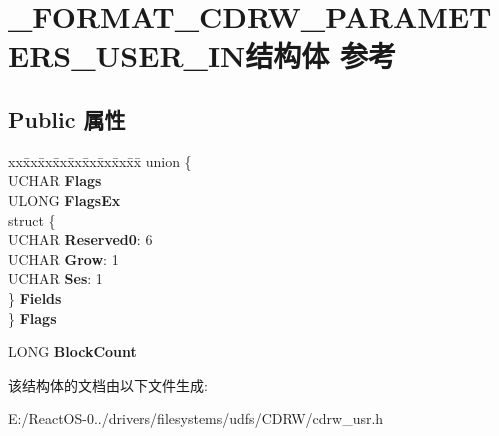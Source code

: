 \hypertarget{struct___f_o_r_m_a_t___c_d_r_w___p_a_r_a_m_e_t_e_r_s___u_s_e_r___i_n}{}\section{\+\_\+\+F\+O\+R\+M\+A\+T\+\_\+\+C\+D\+R\+W\+\_\+\+P\+A\+R\+A\+M\+E\+T\+E\+R\+S\+\_\+\+U\+S\+E\+R\+\_\+\+I\+N结构体 参考}
\label{struct___f_o_r_m_a_t___c_d_r_w___p_a_r_a_m_e_t_e_r_s___u_s_e_r___i_n}
\subsection*{Public 属性}
\begin{DoxyCompactItemize}
\item 
\mbox{\label{struct___f_o_r_m_a_t___c_d_r_w___p_a_r_a_m_e_t_e_r_s___u_s_e_r___i_n_ad0e27c4b8571b7fce09f8ee64b33801e}} 
\begin{tabbing}
xx\=xx\=xx\=xx\=xx\=xx\=xx\=xx\=xx\=\kill
union \{\\
\>UCHAR {\bfseries Flags}\\
\>ULONG {\bfseries FlagsEx}\\
\>struct \{\\
\>\>UCHAR {\bfseries Reserved0}: 6\\
\>\>UCHAR {\bfseries Grow}: 1\\
\>\>UCHAR {\bfseries Ses}: 1\\
\>\} {\bfseries Fields}\\
\} {\bfseries Flags}\\

\end{tabbing}\item 
\mbox{\label{struct___f_o_r_m_a_t___c_d_r_w___p_a_r_a_m_e_t_e_r_s___u_s_e_r___i_n_a2dccf3723f1a0ad385d99db57acb541e}} 
L\+O\+NG {\bfseries Block\+Count}
\end{DoxyCompactItemize}


该结构体的文档由以下文件生成\+:\begin{DoxyCompactItemize}
\item 
E\+:/\+React\+O\+S-\/0../drivers/filesystems/udfs/\+C\+D\+R\+W/cdrw\+\_\+usr.\+h\end{DoxyCompactItemize}

